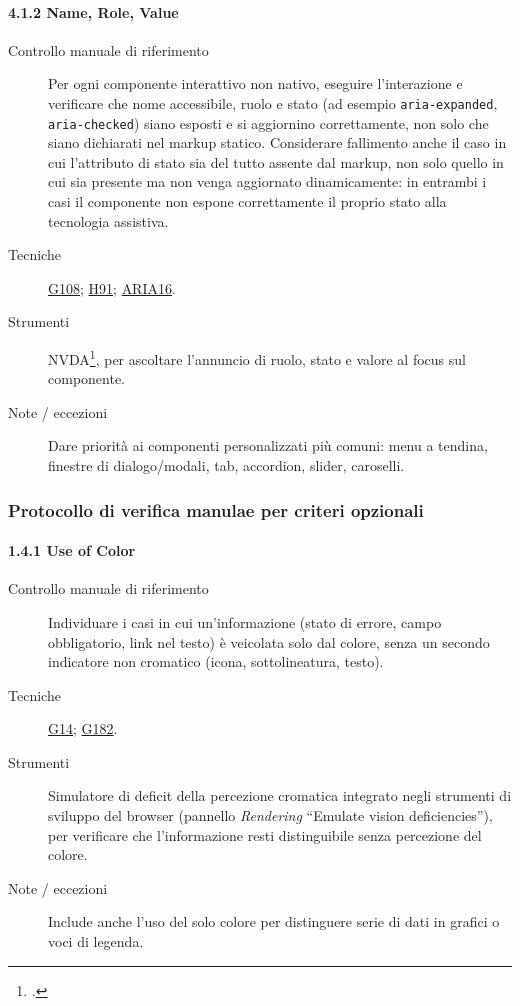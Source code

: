 \paragraph*{4.1.2 Name, Role, Value}
\begin{description}
\item[Controllo manuale di riferimento] Per ogni componente interattivo non nativo, eseguire l'interazione e verificare che nome accessibile, ruolo e stato (ad esempio \texttt{aria-expanded}, \texttt{aria-checked}) siano esposti e si aggiornino correttamente, non solo che siano dichiarati nel markup statico. Considerare fallimento anche il caso in cui l'attributo di stato sia del tutto assente dal markup, non solo quello in cui sia presente ma non venga aggiornato dinamicamente: in entrambi i casi il componente non espone correttamente il proprio stato alla tecnologia assistiva.
\item[Tecniche] \href{https://www.w3.org/WAI/WCAG21/Techniques/general/G108.html}{G108}; \href{https://www.w3.org/WAI/WCAG21/Techniques/html/H91.html}{H91}; \href{https://www.w3.org/WAI/WCAG21/Techniques/aria/ARIA16.html}{ARIA16}.
\item[Strumenti] NVDA\footcite{nvda:screenreader}, per ascoltare l'annuncio di ruolo, stato e valore al focus sul componente.
\item[Note / eccezioni] Dare priorità ai componenti personalizzati più comuni: menu a tendina, finestre di dialogo/modali, tab, accordion, slider, caroselli.
\end{description}

\subsubsection{Protocollo di verifica manulae per criteri opzionali}

\paragraph*{1.4.1 Use of Color}
\begin{description}
\item[Controllo manuale di riferimento] Individuare i casi in cui un'informazione (stato di errore, campo obbligatorio, link nel testo) è veicolata solo dal colore, senza un secondo indicatore non cromatico (icona, sottolineatura, testo).
\item[Tecniche] \href{https://www.w3.org/WAI/WCAG21/Techniques/general/G14.html}{G14}; \href{https://www.w3.org/WAI/WCAG21/Techniques/general/G182.html}{G182}.
\item[Strumenti] Simulatore di deficit della percezione cromatica integrato negli strumenti di sviluppo del browser (pannello \emph{Rendering} \textrightarrow{} \enquote{Emulate vision deficiencies}), per verificare che l'informazione resti distinguibile senza percezione del colore.
\item[Note / eccezioni] Include anche l'uso del solo colore per distinguere serie di dati in grafici o voci di legenda.
\end{description}

